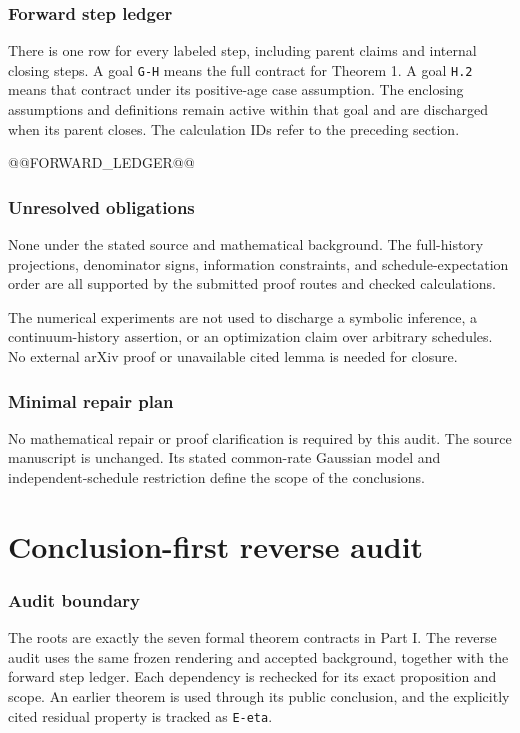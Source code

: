 \documentclass[11pt,letterpaper]{article}
\begin{document}
\section{Forward step ledger}
There is one row for every labeled step, including parent claims and internal closing steps. A goal \texttt{G-H} means the full contract for Theorem 1. A goal \texttt{H.2} means that contract under its positive-age case assumption. The enclosing assumptions and definitions remain active within that goal and are discharged when its parent closes. The calculation IDs refer to the preceding section.

{\footnotesize @@FORWARD_LEDGER@@}

\section{Unresolved obligations}
None under the stated source and mathematical background. The full-history projections, denominator signs, information constraints, and schedule-expectation order are all supported by the submitted proof routes and checked calculations.

The numerical experiments are not used to discharge a symbolic inference, a continuum-history assertion, or an optimization claim over arbitrary schedules. No external arXiv proof or unavailable cited lemma is needed for closure.

\section{Minimal repair plan}
No mathematical repair or proof clarification is required by this audit. The source manuscript is unchanged. Its stated common-rate Gaussian model and independent-schedule restriction define the scope of the conclusions.

\clearpage
\part{Conclusion-first reverse audit}
\section{Audit boundary}
The roots are exactly the seven formal theorem contracts in Part I. The reverse audit uses the same frozen rendering and accepted background, together with the forward step ledger. Each dependency is rechecked for its exact proposition and scope. An earlier theorem is used through its public conclusion, and the explicitly cited residual property is tracked as \texttt{E-eta}.
\end{document}
